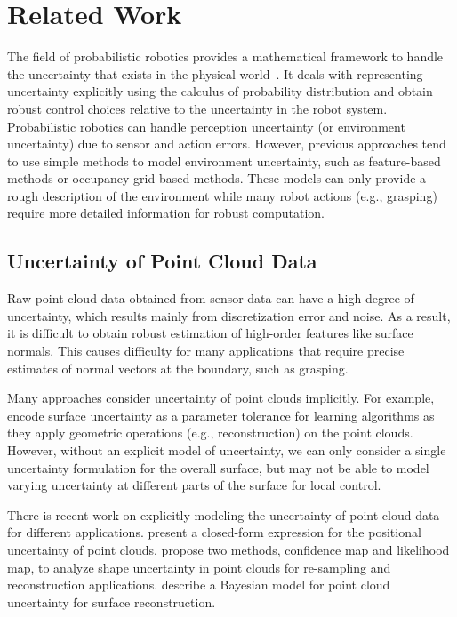 \section{Related Work}
\label{sec:7:related}
The field of probabilistic robotics provides a mathematical framework to handle the uncertainty that exists
in the physical world~\cite{PR:2005}.  It deals with representing uncertainty explicitly using the calculus of probability distribution
and obtain robust control choices relative to the uncertainty in the robot system. Probabilistic robotics can handle perception uncertainty (or environment uncertainty) due to sensor and action errors. However, previous approaches tend to use simple methods to model environment uncertainty, such as feature-based methods or occupancy grid based methods. These models can only provide a rough description of the environment while many robot actions (e.g., grasping) require more detailed information for robust computation.

\subsection{Uncertainty of Point Cloud Data}
\label{sec:7:related:data}
Raw point cloud data obtained from sensor data can have a high degree of uncertainty, which results mainly from
discretization error and noise. As a result, it is difficult to obtain robust estimation of high-order features like surface normals. This causes difficulty for many applications that require precise estimates of normal vectors at the boundary, such as grasping.

Many approaches consider uncertainty of point clouds implicitly. For example, \cite{Steinke:2005,Bernhard:2005nips} encode surface uncertainty as a parameter tolerance for learning algorithms as they apply geometric operations (e.g., reconstruction) on the point clouds. However, without an explicit model of uncertainty, we can only consider a single uncertainty formulation for the overall surface, but may not be able to model varying uncertainty at different parts of the surface for local control.

There is recent work on explicitly modeling the uncertainty of  point cloud data for different applications. \cite{Bae:2009} present a closed-form expression for the positional uncertainty of point clouds. \cite{Pauly:2004} propose two methods, confidence map and likelihood map, to analyze shape uncertainty in
point clouds for re-sampling and reconstruction applications. \cite{Jenke:2006} describe a Bayesian model for point cloud uncertainty
for surface reconstruction.

